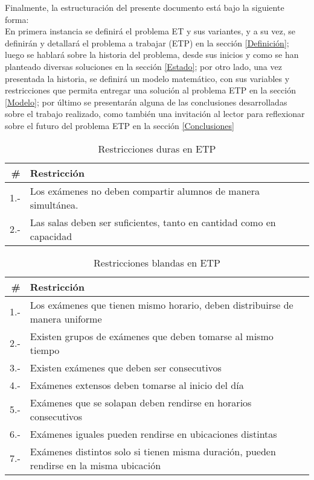 \documentclass[letter, 10pt]{article}
\begin{document}
Finalmente, la estructuración del presente documento está bajo la siguiente forma:\\
En primera instancia se definirá el problema ET y sus variantes, y a su vez, se definirán y detallará el problema a trabajar (ETP) en la sección \ref{Definición}; luego se hablará sobre la historia del problema, desde sus inicios y como se han planteado diversas soluciones en la sección \ref{Estado}; por otro lado, una vez presentada la historia, se definirá un modelo matemático, con sus variables y restricciones que permita entregar una solución al problema ETP en la sección \ref{Modelo}; por último se presentarán alguna de las conclusiones desarrolladas sobre el trabajo realizado, como también una invitación al lector para reflexionar sobre el futuro del problema ETP en la sección \ref{Conclusiones}

\begin{table}[]
    \begin{center}
        \begin{tabular}{| r | l| }
        \hline
        \textbf{#} & \textbf{Restricción} \\ \hline \hline
        1.- & Los exámenes no deben compartir alumnos de manera simultánea.   \\ \hline
        2.- & Las salas deben ser suficientes, tanto en cantidad como en capacidad  \\ \hline
        \end{tabular}
        \caption{Restricciones duras en ETP \cite{Cita5}}
        \label{tab:Restricciones duras}
    \end{center}
\end{table}

\begin{table}[]
    \begin{center}
        \begin{tabular}{| r | l| }
        \hline
        \textbf{#} & \textbf{Restricción} \\ \hline \hline
        1.- & Los exámenes que tienen mismo horario, deben distribuirse de manera uniforme   \\ \hline
        2.- & Existen grupos de exámenes que deben tomarse al mismo tiempo  \\ \hline
        3.- & Existen exámenes que deben ser consecutivos  \\ \hline
        4.- & Exámenes extensos deben tomarse al inicio del día  \\ \hline
        5.- & Exámenes que se solapan deben rendirse en horarios consecutivos  \\ \hline
        6.- & Exámenes iguales pueden rendirse en ubicaciones distintas  \\ \hline
        7.- & Exámenes distintos solo si tienen misma duración, pueden rendirse en la misma ubicación  \\ \hline
        \end{tabular}
        \caption{Restricciones blandas en ETP \cite{Cita5}}
        \label{tab:Restricciones blandas}
    \end{center}
\end{table}
\end{document}
